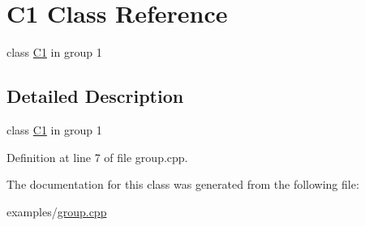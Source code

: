 \hypertarget{class_c1}{}\section{C1 Class Reference}
\label{class_c1}


class \mbox{\hyperlink{class_c1}{C1}} in group 1  




\subsection{Detailed Description}
class \mbox{\hyperlink{class_c1}{C1}} in group 1 

Definition at line 7 of file group.\+cpp.



The documentation for this class was generated from the following file\+:\begin{DoxyCompactItemize}
\item 
examples/\mbox{\hyperlink{group_8cpp}{group.\+cpp}}\end{DoxyCompactItemize}
